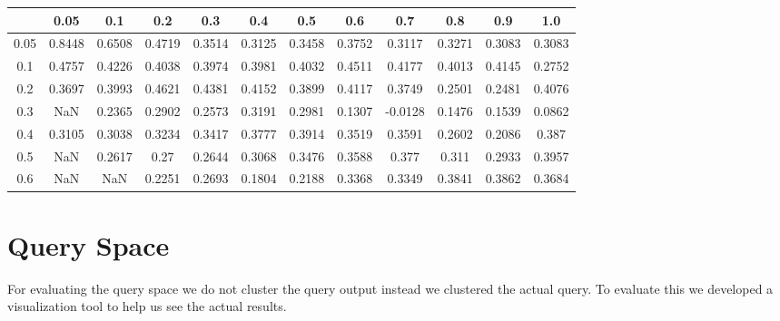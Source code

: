 \documentclass{lmproj}
\begin{document}
\begin{tabular}{|c|c|c|c|c|c|c|c|c|c|c|c|}
		\hline    & 0.05   & 0.1    & 0.2    & 0.3    & 0.4    & 0.5    & 0.6    & 0.7     & 0.8    & 0.9    & 1.0   \\ 
		\hline 	0.05 & 0.8448 & 0.6508 & 0.4719 & 0.3514 & 0.3125 & 0.3458 & 0.3752 & 0.3117  & 0.3271 & 0.3083 & 0.3083 \\
		\hline 	0.1  & 0.4757 & 0.4226 & 0.4038 & 0.3974 & 0.3981 & 0.4032 & 0.4511 & 0.4177  & 0.4013 & 0.4145 & 0.2752 \\
		\hline 	0.2  & 0.3697 & 0.3993 & 0.4621 & 0.4381 & 0.4152 & 0.3899 & 0.4117 & 0.3749  & 0.2501 & 0.2481 & 0.4076 \\
		\hline 0.3  & NaN      & 0.2365 & 0.2902 & 0.2573 & 0.3191 & 0.2981 & 0.1307 & -0.0128 & 0.1476 & 0.1539 & 0.0862 \\
		\hline 	0.4  & 0.3105 & 0.3038 & 0.3234 & 0.3417 & 0.3777 & 0.3914 & 0.3519 & 0.3591  & 0.2602 & 0.2086 & 0.387  \\
		\hline 	0.5  & NaN      & 0.2617 & 0.27   & 0.2644 & 0.3068 & 0.3476 & 0.3588 & 0.377   & 0.311  & 0.2933 & 0.3957 \\
		\hline 	0.6  & NaN      & NaN      & 0.2251 & 0.2693 & 0.1804 & 0.2188 & 0.3368 & 0.3349  & 0.3841 & 0.3862 & 0.3684 \\
		\hline
\end{tabular}


\section{Query Space}

For evaluating the query space we do not cluster the query output instead we clustered the actual query. To evaluate this we developed a visualization tool to help us see the actual results.

\begin{figure} [h]
\end{figure}
 
\end{document}
